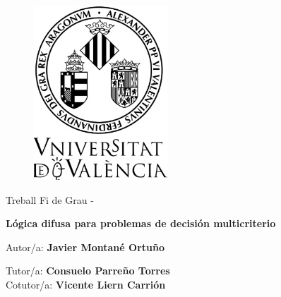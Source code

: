 \begin{titlepage}

    \begin{center}
    \vspace*{-1in}
    \begin{figure}[H]
    \begin{center}
    \includegraphics[width=5cm]{Escut.png}
    \end{center}
    \end{figure}
    
    \vspace*{0.5in}
    
    \begin{Huge}
    Treball Fi de Grau - \@date
    
    \vspace*{0.5in}
    
    \textbf{Lógica difusa para problemas de decisión multicriterio} \\
    \end{Huge}
    
    \vspace*{0.1in}
    
    
    \vspace*{0.2in}
    
    \begin{huge}
    Autor/a: {\bf
    Javier Montané Ortuño} \\
    \end{huge}
    
    \vspace*{0.2in}
    
    \begin{Large}
    Tutor/a: {\bf \sc
    Consuelo Parreño Torres} \\
    Cotutor/a: {\bf \sc
    Vicente Liern Carrión} \\
    \end{Large}
    

\end{center}
\end{titlepage}
